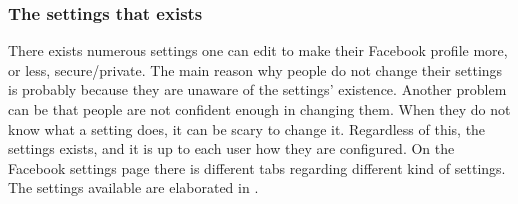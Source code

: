 \subsubsection{The settings that exists}
There exists numerous settings one can edit to make their Facebook profile more, or less, secure/private. The main reason why people do not change their settings is probably because they are unaware of the settings' existence. Another problem can be that people are not confident enough in changing them. When they do not know what a setting does, it can be scary to change it. Regardless of this, the settings exists, and it is up to each user how they are configured. 
On the Facebook settings page there is different tabs regarding different kind of settings. The settings available are elaborated in .

\newpage

